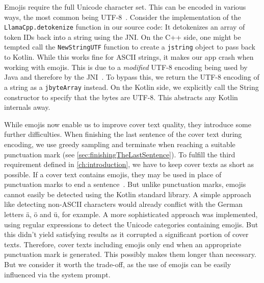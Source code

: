 Emojis require the full Unicode character set. This can be encoded in various ways, the most common being UTF-8~\cite{gleaveMakingCompressionAlgorithms2017}. Consider the implementation of the \lstinline|LlamaCpp.detokenize| function in our source code: It detokenizes an array of token IDs back into a string using the \gls{JNI}. On the C++ side, one might be tempted call the \lstinline|NewStringUTF| function to create a \lstinline|jstring| object to pass back to Kotlin. While this works fine for ASCII strings, it makes our app crash when working with emojis. This is due to a \textit{modified} UTF-8 encoding being used by Java and therefore by the \gls{JNI}~\cite{oracleJNIFunctions}. To bypass this, we return the UTF-8 encoding of a string as a \lstinline|jbyteArray| instead. On the Kotlin side, we explicitly call the String constructor to specify that the bytes are UTF-8. This abstracts any Kotlin internals away.

While emojis now enable us to improve cover text quality, they introduce some further difficulties. When finishing the last sentence of the cover text during encoding, we use greedy sampling and terminate when reaching a suitable punctuation mark (see \cref{sec:finishingTheLastSentence}). To fulfill the third requirement defined in \cref{ch:introduction}, we have to keep cover texts as short as possible. If a cover text contains emojis, they may be used in place of punctuation marks to end a sentence~\cite{zhouGoodbyeTextHello2017}. But unlike punctuation marks, emojis cannot easily be detected using the Kotlin standard library. A simple approach like detecting non-ASCII characters would already conflict with the German letters ä, ö and ü, for example. A more sophisticated approach was implemented, using regular expressions to detect the Unicode categories containing emojis. But this didn't yield satisfying results as it corrupted a significant portion of cover texts. Therefore, cover texts including emojis only end when an appropriate punctuation mark is generated. This possibly makes them longer than necessary. But we consider it worth the trade-off, as the use of emojis can be easily influenced via the system prompt.
